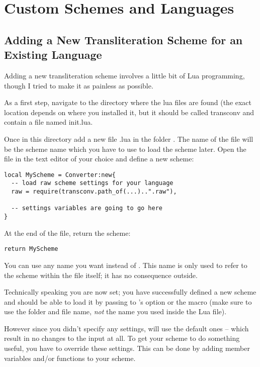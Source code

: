 \documentclass{ltxdockit}
\begin{document}
\section{Custom Schemes and Languages}

\subsection{Adding a New Transliteration Scheme for an Existing Language}

Adding a new transliteration scheme involves a little bit of Lua programming,
though I tried to make it as painless as possible.

As a first step, navigate to the directory where the \transconv{} lua files are
found (the exact location depends on where you installed it, but it should be
called transconv and contain a file named init.lua.

Once in this directory add a new file .lua in the folder .
The name of the file will be the scheme name which you have to use to load the
scheme later. Open the file in the text editor of your choice and define a new
scheme:

\begin{lstlisting}
local MyScheme = Converter:new{
  -- load raw scheme settings for your language
  raw = require(transconv.path_of(...)..".raw"),

  -- settings variables are going to go here
}
\end{lstlisting}

At the end of the file, return the scheme:

\begin{lstlisting}
return MyScheme
\end{lstlisting}

You can use any name you want instead of . This name is only used
to refer to the scheme within the file itself; it has no consequence outside.

Technically speaking you are now set; you have successfully defined a new scheme
and should be able to load it by passing  to
\transconv{}'s  option or the
 macro (make sure to use the
folder and file name, \emph{not} the name you used inside the Lua file).

However since you didn't specify any settings, \transconv{} will use the
default ones -- which result in no changes to the input at all. To get your
scheme to do something useful, you have to override these settings. This can be
done by adding member variables and/or functions to your scheme.
\end{document}
